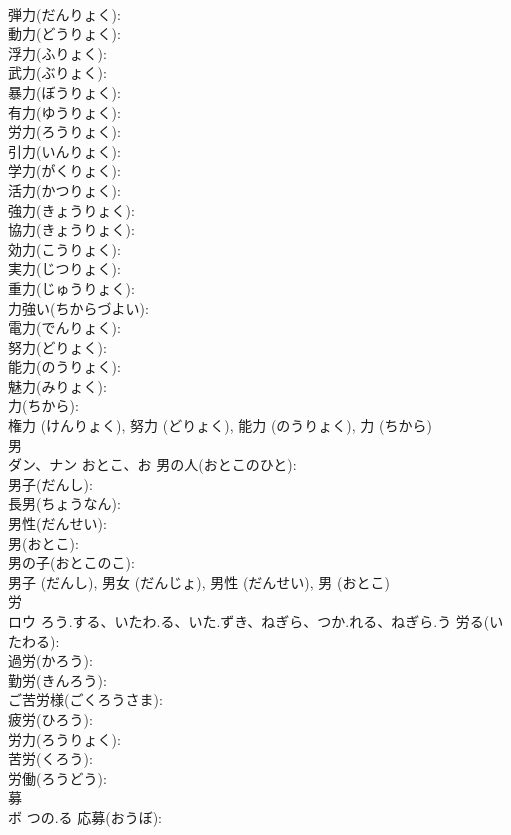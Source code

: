 \documentclass[8pt]{extreport}
\begin{document}
\begin{CJK}{UTF8}{min}
\\	弾力(だんりょく): 
\\	動力(どうりょく): 
\\	浮力(ふりょく): 
\\	武力(ぶりょく): 
\\	暴力(ぼうりょく): 
\\	有力(ゆうりょく): 
\\	労力(ろうりょく): 
\\	引力(いんりょく): 
\\	学力(がくりょく): 
\\	活力(かつりょく): 
\\	強力(きょうりょく): 
\\	協力(きょうりょく): 
\\	効力(こうりょく): 
\\	実力(じつりょく): 
\\	重力(じゅうりょく): 
\\	力強い(ちからづよい): 
\\	電力(でんりょく): 
\\	努力(どりょく): 
\\	能力(のうりょく): 
\\	魅力(みりょく): 
\\	力(ちから): 
\\	権力 (けんりょく), 努力 (どりょく), 能力 (のうりょく), 力 (ちから)
\\	男			
\\	ダン、ナン	おとこ、お	男の人(おとこのひと): 
\\	男子(だんし): 
\\	長男(ちょうなん): 
\\	男性(だんせい): 
\\	男(おとこ): 
\\	男の子(おとこのこ): 
\\	男子 (だんし), 男女 (だんじょ), 男性 (だんせい), 男 (おとこ)
\\	労			
\\	ロウ	ろう.する、いたわ.る、いた.ずき、ねぎら、つか.れる、ねぎら.う	労る(いたわる): 
\\	過労(かろう): 
\\	勤労(きんろう): 
\\	ご苦労様(ごくろうさま): 
\\	疲労(ひろう): 
\\	労力(ろうりょく): 
\\	苦労(くろう): 
\\	労働(ろうどう): 
\\	募			
\\	ボ	つの.る	応募(おうぼ): 

\end{CJK}
\end{document}
